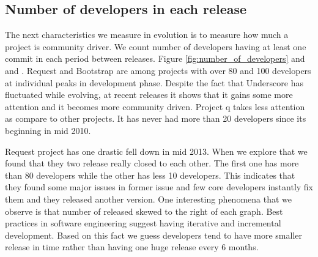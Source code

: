 \subsection{Number of developers in each release}
The next characteristics we measure in evolution is to measure how much a project is community driver. We count number of developers having at least one commit in each period between releases. Figure \ref{fig:number_of_developers} and and . Request and Bootstrap are among projects with over 80 and 100 developers at individual peaks in development phase. Despite the fact that Underscore has fluctuated while evolving, at recent releases it shows that it gains some more attention and it becomes more community driven. Project q takes less attention as compare to other projects. It has never had more than 20 developers since its beginning in mid 2010.
\par
Request project has one drastic fell down in mid 2013. When we explore that we found that they two release really closed to each other. The first one has more than 80 developers while the other has less 10 developers. This indicates that they found some major issues in former issue and few core developers instantly fix them and they released another version. One interesting phenomena that we observe is that number of released skewed to the right of each graph. Best practices in software engineering suggest having iterative and incremental development. Based on this fact we guess developers tend to have more smaller release in time rather than having one huge release every 6 months.  
